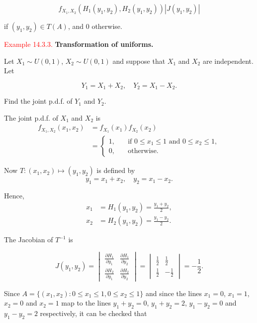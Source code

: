 \documentclass[
]{book}
\begin{document}
\[f_{X_1,X_2}(H_1(y_1,y_2),H_2(y_1,y_2)) |J(y_1,y_2)|\]

if \((y_1, y_2) \in T(A)\), and \(0\) otherwise.

\leavevmode{}%
\textcolor{red}{Example 14.3.3.}
{\textbf{Transformation of uniforms.}}

Let \(X_1 \sim U(0,1)\), \(X_2 \sim U(0,1)\) and suppose that \(X_1\) and \(X_2\) are independent. Let

\[ Y_1=X_1+X_2, \quad Y_2=X_1-X_2.\]

Find the joint p.d.f. of \(Y_1\) and \(Y_2\).

The joint p.d.f. of \(X_1\) and \(X_2\) is\\

\begin{align*}
f_{X_1,X_2}(x_1,x_2) &= f_{X_1}(x_1)f_{X_2}(x_2) \\
&= \begin{cases} 1, \quad & \text{if } 0 \leq x_1 \leq 1 \text{ and } 0 \leq x_2 \leq 1,\\[3pt]
0, \quad & \text{otherwise.}\end{cases}
\end{align*}

Now \(T:(x_1,x_2) \mapsto (y_1,y_2)\) is defined by\\

\[ y_1=x_1+x_2,\quad y_2=x_1-x_2.\]

Hence,\\

\begin{align*}
x_1 &= H_1(y_1,y_2) = \frac{y_1+y_2}{2}, \\
x_2 &= H_2(y_1,y_2) = \frac{y_1-y_2}{2}.
\end{align*}

The Jacobian of \(T^{-1}\) is

\[ J(y_1,y_2) =
\begin{vmatrix} \frac{\partial H_1}{\partial y_1} &
\frac{\partial H_1}{\partial y_2} \\
\frac{\partial H_2}{\partial y_1} &
\frac{\partial H_2}{\partial y_2} \end{vmatrix}
=\begin{vmatrix} \frac{1}{2} & \frac{1}{2} \\ \frac{1}{2} & -\frac{1}{2} \end{vmatrix} = -\frac{1}{2}.\]

Since \(A=\{(x_1,x_2): 0 \leq x_1 \leq 1, 0 \leq x_2 \leq 1\}\) and since the lines \(x_1=0\), \(x_1=1\), \(x_2=0\) and \(x_2=1\) map to the lines \(y_1+y_2=0\), \(y_1+y_2=2\), \(y_1-y_2=0\) and \(y_1-y_2=2\) respectively, it can be checked that\\
\end{document}
